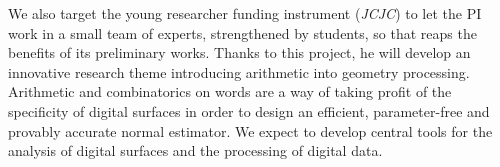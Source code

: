 We also target the young researcher funding instrument (\emph{JCJC}) 
to let the PI work in a small team of experts, strengthened by students,
so that reaps the benefits of its preliminary works. %
Thanks to this project, he will develop an innovative research theme
introducing arithmetic into geometry processing. 
Arithmetic and combinatorics on words are a way of taking profit of the
specificity of digital surfaces in order to design an efficient,
parameter-free and provably accurate normal estimator. We expect to
develop central tools for the analysis of digital surfaces and the processing
of digital data. 




